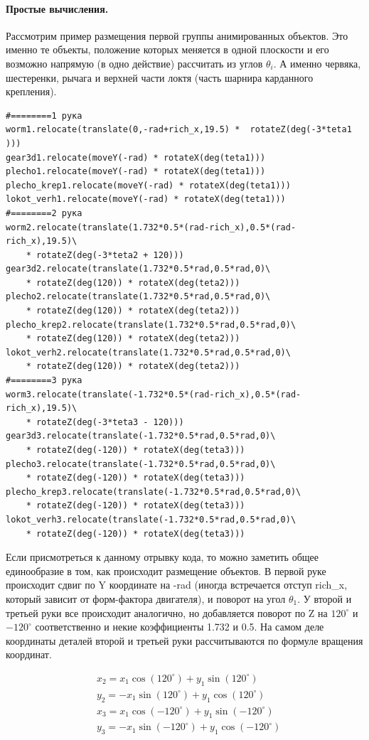 \paragraph{Простые вычисления.} Рассмотрим пример размещения первой группы анимированных объектов. Это именно те объекты, положение которых меняется в одной плоскости и его возможно напрямую (в одно действие) рассчитать из углов $\theta_{i}$. А именно червяка, шестеренки, рычага и верхней части локтя (часть шарнира карданного крепления). 
\begin{lstlisting}[style=python,caption=Простые анимированные объекты]
#========1 рука
worm1.relocate(translate(0,-rad+rich_x,19.5) *  rotateZ(deg(-3*teta1 )))
gear3d1.relocate(moveY(-rad) * rotateX(deg(teta1)))
plecho1.relocate(moveY(-rad) * rotateX(deg(teta1)))
plecho_krep1.relocate(moveY(-rad) * rotateX(deg(teta1)))
lokot_verh1.relocate(moveY(-rad) * rotateX(deg(teta1)))
#========2 рука
worm2.relocate(translate(1.732*0.5*(rad-rich_x),0.5*(rad-rich_x),19.5)\
    * rotateZ(deg(-3*teta2 + 120)))
gear3d2.relocate(translate(1.732*0.5*rad,0.5*rad,0)\
    * rotateZ(deg(120)) * rotateX(deg(teta2)))
plecho2.relocate(translate(1.732*0.5*rad,0.5*rad,0)\
    * rotateZ(deg(120)) * rotateX(deg(teta2)))
plecho_krep2.relocate(translate(1.732*0.5*rad,0.5*rad,0)\
    * rotateZ(deg(120)) * rotateX(deg(teta2)))
lokot_verh2.relocate(translate(1.732*0.5*rad,0.5*rad,0)\
    * rotateZ(deg(120)) * rotateX(deg(teta2)))  
#========3 рука
worm3.relocate(translate(-1.732*0.5*(rad-rich_x),0.5*(rad-rich_x),19.5)\
    * rotateZ(deg(-3*teta3 - 120)))
gear3d3.relocate(translate(-1.732*0.5*rad,0.5*rad,0)\
    * rotateZ(deg(-120)) * rotateX(deg(teta3)))
plecho3.relocate(translate(-1.732*0.5*rad,0.5*rad,0)\
    * rotateZ(deg(-120)) * rotateX(deg(teta3)))
plecho_krep3.relocate(translate(-1.732*0.5*rad,0.5*rad,0)\
    * rotateZ(deg(-120)) * rotateX(deg(teta3)))
lokot_verh3.relocate(translate(-1.732*0.5*rad,0.5*rad,0)\
    * rotateZ(deg(-120)) * rotateX(deg(teta3)))
\end{lstlisting}

Если присмотреться к данному отрывку кода, то можно заметить общее единообразие в том, как происходит размещение объектов. В первой руке происходит сдвиг по Y координате на -rad (иногда встречается отступ rich\_x, который зависит от форм-фактора двигателя), и поворот на угол $\theta_{1}$. У второй и третьей руки все происходит аналогично, но добавляется поворот по Z на $120^{\circ}$ и $-120^{\circ}$ соответственно и некие коэффициенты 1.732 и 0.5. На самом деле координаты деталей второй и третьей руки рассчитываются по формуле вращения координат.
\begin{center}
\begin{align}
&x_{2}=x_{1}\cos{(120^{\circ})} + y_{1}\sin{(120^{\circ})} \nonumber\\
&y_{2}=-x_{1}\sin{(120^{\circ})}+ y_{1}\cos{(120^{\circ})} \nonumber\\
&x_{3}=x_{1}\cos{(-120^{\circ})}+ y_{1}\sin{(-120^{\circ})} \nonumber\\
&y_{3}=-x_{1}\sin{(-120^{\circ})}+ y_{1}\cos{(-120^{\circ})} \nonumber
\end{align}
\end{center}


